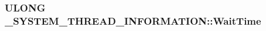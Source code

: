 \subsubsection[{Wait\-Time}]{\setlength{\rightskip}{0pt plus 5cm}U\-L\-O\-N\-G \-\_\-\-S\-Y\-S\-T\-E\-M\-\_\-\-T\-H\-R\-E\-A\-D\-\_\-\-I\-N\-F\-O\-R\-M\-A\-T\-I\-O\-N\-::\-Wait\-Time}\label{struct___s_y_s_t_e_m___t_h_r_e_a_d___i_n_f_o_r_m_a_t_i_o_n_a4e3fa57cc4de5c02295309a9dfa58d57}
